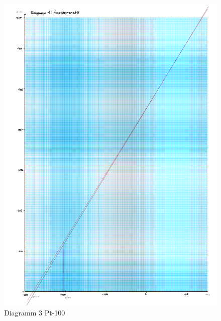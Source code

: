 \begin{figure}[h!]
    \centering
    \includegraphics[page=3, width=.95\textwidth,]{41Dias.pdf}
    \caption{Diagramm 3 Pt-100}
\end{figure}
\newpage
